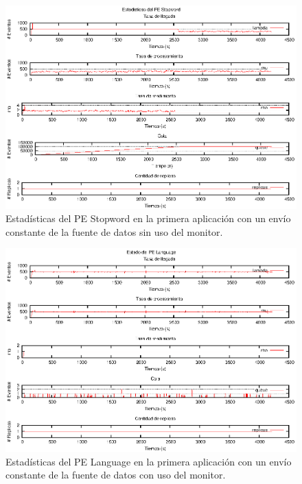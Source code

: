 \begin{figure}[p]
\centering
    \includegraphics[scale=1.1]{images/exp/app1/uniform/sm/statusStopwordPE.eps}
    \caption{Estadísticas del PE Stopword en la primera aplicación con un envío constante de la fuente de datos sin uso del monitor.}
    \label{fig:app1-uniform-statusStopwordPE-sm}
\end{figure}

\begin{figure}[p]
\centering
    \includegraphics[scale=1.1]{images/exp/app1/uniform/cm/statusLanguagePE.eps}
    \caption{Estadísticas del PE Language en la primera aplicación con un envío constante de la fuente de datos con uso del monitor.}
    \label{fig:app1-uniform-statusLanguagePE-cm}
\end{figure}

